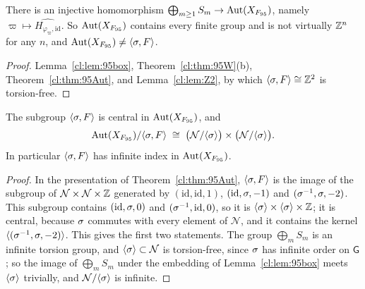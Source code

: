 \begin{corollary}\label{cl:cor:95G}
There is an injective homomorphism $\bigoplus_{m\ge1}S_m\to\operatorname{Aut}(X_{F_{95}})$, namely $\varpi\mapsto\widehat{H_{\varphi_\varpi,\mathrm{id}}}$. So $\operatorname{Aut}(X_{F_{95}})$ contains every finite group and is not virtually $\mathbb{Z}^n$ for any $n$, and $\operatorname{Aut}(X_{F_{95}})\ne\langle\sigma,F\rangle$.
\end{corollary}

\begin{proof}
Lemma~\ref{cl:lem:95box}, Theorem~\ref{cl:thm:95W}(b), Theorem~\ref{cl:thm:95Aut}, and Lemma~\ref{cl:lem:Z2}, by which $\langle\sigma,F\rangle\cong\mathbb{Z}^2$ is torsion-free.
\end{proof}

\begin{corollary}\label{cl:cor:95quot}
The subgroup $\langle\sigma,F\rangle$ is central in $\operatorname{Aut}(X_{F_{95}})$, and
\[
\operatorname{Aut}(X_{F_{95}})/\langle\sigma,F\rangle\;\cong\;\bigl(\mathcal N/\langle\sigma\rangle\bigr)\times\bigl(\mathcal N/\langle\sigma\rangle\bigr).
\]
In particular $\langle\sigma,F\rangle$ has infinite index in $\operatorname{Aut}(X_{F_{95}})$.
\end{corollary}

\begin{proof}
In the presentation of Theorem~\ref{cl:thm:95Aut}, $\langle\sigma,F\rangle$ is the image of the subgroup of $\mathcal N\times\mathcal N\times\mathbb{Z}$ generated by $(\mathrm{id},\mathrm{id},1)$, $(\mathrm{id},\sigma,-1)$ and $(\sigma^{-1},\sigma,-2)$. This subgroup contains $(\mathrm{id},\sigma,0)$ and $(\sigma^{-1},\mathrm{id},0)$, so it is $\langle\sigma\rangle\times\langle\sigma\rangle\times\mathbb{Z}$; it is central, because $\sigma$ commutes with every element of $\mathcal N$, and it contains the kernel $\langle(\sigma^{-1},\sigma,-2)\rangle$. This gives the first two statements. The group $\bigoplus_mS_m$ is an infinite torsion group, and $\langle\sigma\rangle\subset\mathcal N$ is torsion-free, since $\sigma$ has infinite order on $\mathsf G$; so the image of $\bigoplus_mS_m$ under the embedding of Lemma~\ref{cl:lem:95box} meets $\langle\sigma\rangle$ trivially, and $\mathcal N/\langle\sigma\rangle$ is infinite.
\end{proof}

